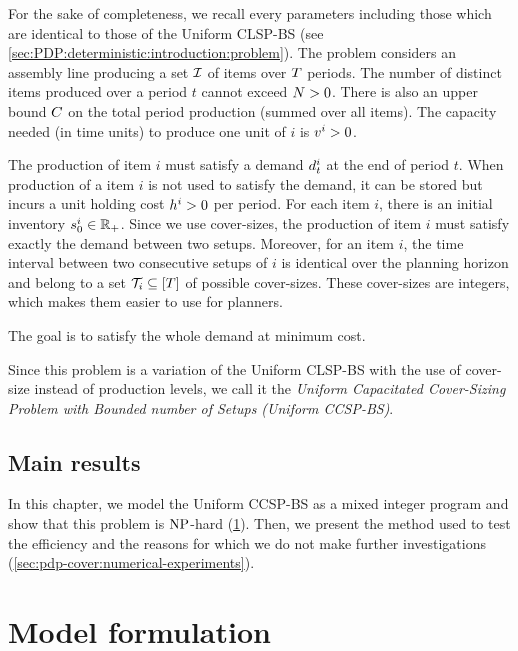 For the sake of completeness, we recall every parameters including those which are identical to those of the Uniform CLSP-BS (see \cref{sec:PDP:deterministic:introduction:problem}).
The problem considers an assembly line producing a set $\mathcal{I}$ of items over $T$ periods.
The number of distinct items produced over a period $t$ cannot exceed $N>0$.
There is also an upper bound $C$ on the total period production (summed over all items).
The capacity needed (in time units) to produce one unit of $i$ is $v^i>0$.


The production of item $i$ must satisfy a demand $d_t^i$ at the end of period $t$.
When production of a item $i$ is not used to satisfy the demand, it can be stored but incurs a unit holding cost $h^i>0$ per period.
For each item $i$, there is an initial inventory $s_0^i\in\mathbb{R}_+$.
Since we use cover-sizes, the production of item $i$ must satisfy exactly the demand between two setups.
Moreover, for an item $i$, the time interval between two consecutive setups of $i$ is identical over the planning horizon and belong to a set $\coverset_i\subseteq\range{\horizon}$ of possible cover-sizes.
These cover-sizes are integers, which makes them easier to use for planners.


The goal is to satisfy the whole demand at minimum cost.


Since this problem is a variation of the Uniform CLSP-BS with the use of cover-size instead of production levels, we call it the \emph{Uniform Capacitated Cover-Sizing Problem with Bounded number of Setups (Uniform CCSP-BS)}.


\subsection{Main results}


In this chapter, we model the Uniform CCSP-BS as a mixed integer program and show that this problem is $\operatorname{NP}$-hard (\cref{sec:pdp-cover:model-formulation}).
Then, we present the method used to test the efficiency and the reasons for which we do not make further investigations (\cref{sec:pdp-cover:numerical-experiments}).


\section{Model formulation}
\label{sec:pdp-cover:model-formulation}




